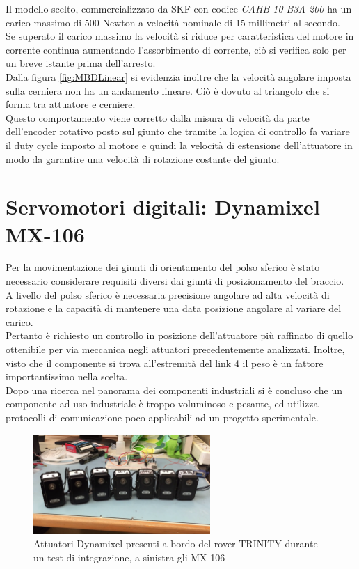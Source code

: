 \documentclass[%
corpo=11pt,
twoside,
 stile=classica,
oldstyle,
greek,%
]{toptesi}
\begin{document}
	Il modello scelto, commercializzato da SKF con codice \textit{CAHB-10-B3A-200} ha un carico massimo di 500 Newton a velocità nominale di 15 millimetri al secondo. \\
	Se superato il carico massimo la velocità si riduce per caratteristica del motore in corrente continua aumentando l'assorbimento di corrente, ciò si verifica solo per un breve istante prima dell'arresto.\\
	 Dalla figura \ref{fig:MBDLinear} si evidenzia inoltre che la velocità angolare imposta sulla cerniera non ha un andamento lineare. Ciò è dovuto al triangolo che si forma tra attuatore e cerniere. \\
	Questo comportamento viene corretto dalla misura di velocità da parte dell'encoder rotativo posto sul giunto che tramite la logica di controllo fa variare il duty cycle imposto al motore e quindi la velocità di estensione dell'attuatore in modo da garantire una velocità di rotazione costante del giunto. 
	
	
		\newpage
	\section{Servomotori digitali: Dynamixel MX-106}
	Per la movimentazione dei giunti di orientamento del polso sferico è stato necessario considerare requisiti diversi dai giunti di posizionamento del braccio.\\
	 A livello del polso sferico è necessaria precisione angolare ad alta velocità di rotazione e la capacità di mantenere una data posizione angolare al variare del carico.\\
	  Pertanto è richiesto un controllo in posizione dell'attuatore più raffinato di quello ottenibile per via meccanica negli attuatori precedentemente analizzati. Inoltre, visto che il componente si trova all'estremità del link 4 il peso è un fattore importantissimo nella scelta. \\
	Dopo una ricerca nel panorama dei componenti industriali si è concluso che un componente ad uso industriale è troppo voluminoso e pesante, ed utilizza protocolli di comunicazione poco applicabili ad un progetto sperimentale. 
	
	\begin{figure}
		\centering
		\includegraphics[width=0.6\textwidth]{image/dynamixel.png}
		\caption{Attuatori Dynamixel presenti a bordo del rover TRINITY durante un test di integrazione, a sinistra gli MX-106}
		\label{fig:MX160}
	\end{figure}
\end{document}
